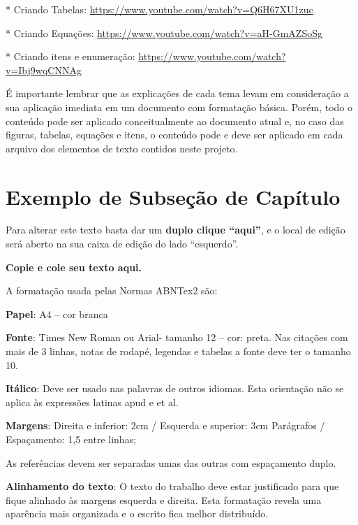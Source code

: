 * Criando Tabelas: \url{https://www.youtube.com/watch?v=Q6H67XU1zuc}

* Criando Equações: \url{https://www.youtube.com/watch?v=aH-GmAZSoSg}

* Criando itens e enumeração: \url{https://www.youtube.com/watch?v=Ibj9wqCNNAg}

É importante lembrar que as explicações de cada tema levam em consideração a sua aplicação imediata em um documento com formatação básica. Porém, todo o conteúdo pode ser aplicado conceitualmente ao documento atual e, no caso das figuras, tabelas, equações e itens, o conteúdo pode e deve ser aplicado em cada arquivo dos elementos de texto contidos neste projeto.

\section{Exemplo de Subseção  de Capítulo}
\label{cap01:sec02}
Para alterar este texto basta dar um 
\textbf{duplo clique “aqui”}, e o local de edição será aberto na sua caixa de edição do lado “esquerdo”.

\textbf{Copie e cole seu texto aqui.}

A formatação usada  pelas Normas ABNTex2 são:

\textbf{Papel}: A4 – cor branca

\textbf{Fonte}: Times New Roman ou Arial- tamanho 12 – cor: preta. Nas citações com mais de 3 linhas, notas de rodapé, legendas e tabelas a fonte deve ter o tamanho 10.

\textbf{Itálico}: Deve ser usado nas palavras de outros idiomas. Esta orientação não se aplica às expressões latinas apud e et al.

\textbf{Margens}: Direita e inferior: 2cm / Esquerda e superior: 3cm
Parágrafos / Espaçamento: 1,5 entre linhas;

As referências devem ser separadas umas das outras com espaçamento duplo.

\textbf{Alinhamento do texto}: O texto do trabalho deve estar justificado para que fique alinhado às margens esquerda e direita. Esta formatação revela uma aparência mais organizada e o escrito fica melhor distribuído.